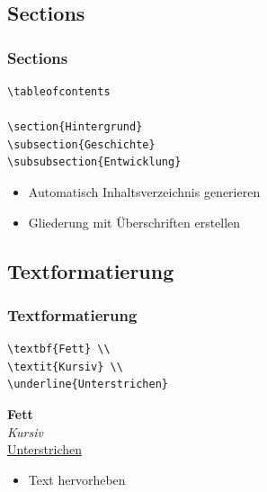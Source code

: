 \documentclass[aspectratio=169]{beamer}
\begin{document}
\subsection{Sections}
\begin{frame}[fragile]
\frametitle{Sections}

\begin{lstlisting}[language={[latex]TeX}]
\tableofcontents

\section{Hintergrund}
\subsection{Geschichte}
\subsubsection{Entwicklung}
\end{lstlisting}

\vspace{1em}

\begin{itemize}
  \item Automatisch Inhaltsverzeichnis generieren
  \item Gliederung mit Überschriften erstellen
\end{itemize}

\end{frame}


\subsection{Textformatierung}
\begin{frame}[fragile]
\frametitle{Textformatierung}

\begin{lstlisting}[language={[latex]TeX}]
\textbf{Fett} \\
\textit{Kursiv} \\
\underline{Unterstrichen}
\end{lstlisting}

\vspace{1em}

\textbf{Fett} \\
\textit{Kursiv} \\
\underline{Unterstrichen} 

\vspace{1em}

\begin{itemize}
  \item Text hervorheben
\end{itemize}

\end{frame}
\end{document}
